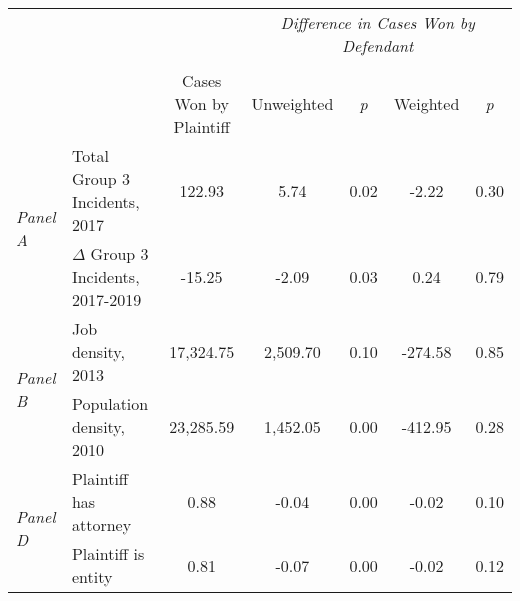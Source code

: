 \begin{tabular}{llccccc}
\toprule
 &  & \textit{} & \multicolumn{4}{c}{\textit{Difference in Cases Won by Defendant}} \\
\cline{4-7}
\\
 &  & Cases Won by Plaintiff & Unweighted & \emph{p} & Weighted & \emph{p} \\
\midrule
\multirow[c]{2}{3cm}{\textit{Panel A}} & Total Group 3 Incidents, 2017 & 122.93 & 5.74 & 0.02 & -2.22 & 0.30 \\
 & $\Delta$ Group 3 Incidents, 2017-2019 & -15.25 & -2.09 & 0.03 & 0.24 & 0.79 \\
\cline{1-7}
\multirow[c]{2}{3cm}{\textit{Panel B}} & Job density, 2013 & 17,324.75 & 2,509.70 & 0.10 & -274.58 & 0.85 \\
 & Population density, 2010 & 23,285.59 & 1,452.05 & 0.00 & -412.95 & 0.28 \\
\cline{1-7}
\multirow[c]{2}{3cm}{\textit{Panel D}} & Plaintiff has attorney & 0.88 & -0.04 & 0.00 & -0.02 & 0.10 \\
 & Plaintiff is entity & 0.81 & -0.07 & 0.00 & -0.02 & 0.12 \\
\cline{1-7}
\bottomrule
\end{tabular}
